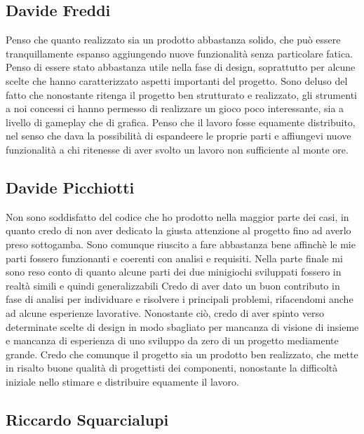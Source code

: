 \documentclass[a4paper,12pt]{report}
\begin{document}
    \subsection{Davide Freddi}
    Penso che quanto realizzato sia un prodotto abbastanza solido, che può essere tranquillamente espanso aggiungendo nuove funzionalità senza particolare fatica.
    Penso di essere stato abbastanza utile nella fase di design, soprattutto per alcune scelte che hanno caratterizzato aspetti importanti del progetto.
    Sono deluso del fatto che nonostante ritenga il progetto ben strutturato e realizzato, gli strumenti a noi concessi ci hanno permesso di realizzare un gioco poco interessante, sia a livello di gameplay che di grafica.
    Penso che il lavoro fosse equamente distribuito, nel senso che dava la possibilità di espandeere le proprie parti e affiungevi nuove funzionalità a chi ritenesse di aver svolto un lavoro non sufficiente al monte ore.
    \subsection{Davide Picchiotti}
    Non sono soddisfatto del codice che ho prodotto nella maggior parte dei casi, in quanto credo di non aver dedicato la giusta attenzione
    al progetto fino ad averlo preso sottogamba.
    Sono comunque riuscito a fare abbastanza bene affinchè le mie parti fossero funzionanti e coerenti con analisi e requisiti.\newline
    Nella parte finale mi sono reso conto di quanto alcune parti dei due minigiochi sviluppati fossero in realtà simili e quindi generalizzabili\newline
    Credo di aver dato un buon contributo in fase di analisi per individuare e risolvere i principali problemi, rifacendomi anche ad alcune esperienze lavorative.
    Nonostante ciò, credo di aver spinto verso determinate scelte di design in modo sbagliato per mancanza di visione di insieme e mancanza
    di esperienza di uno sviluppo da zero di un progetto mediamente grande.\newline
    Credo che comunque il progetto sia un prodotto ben realizzato, che mette in risalto buone qualità di progettisti dei componenti,
    nonostante la difficoltà iniziale nello stimare e distribuire equamente il lavoro.

    \subsection{Riccardo Squarcialupi}
\end{document}
